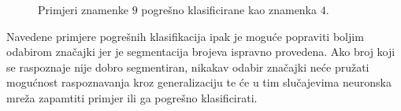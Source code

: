 \begin{figure}[htb]
    \centering
    \caption{Primjeri znamenke $9$ pogrešno klasificirane kao znamenka $4$.}
    \label{fig:missclassified-9-as-4}
\end{figure}
\newline
Navedene primjere pogrešnih klasifikacija ipak je moguće popraviti boljim odabirom značajki jer je segmentacija brojeva
ispravno provedena. Ako broj koji se raspoznaje nije dobro segmentiran, nikakav odabir značajki neće pružati mogućnost
raspoznavanja kroz generalizaciju te će u tim slučajevima neuronska mreža zapamtiti primjer ili ga pogrešno
klasificirati.

